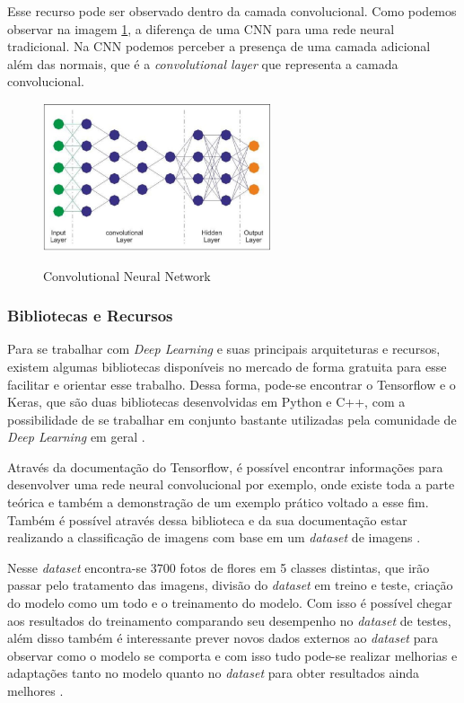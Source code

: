 Esse recurso pode ser observado dentro da camada convolucional. Como podemos observar na imagem \ref{fig:cnn}, a diferença de uma CNN para uma rede neural tradicional. Na CNN podemos perceber a presença de uma camada adicional além das normais, que é a \emph{convolutional layer} que representa a camada convolucional.

\begin{figure}[!htb]
	\centering
	\caption{Convolutional Neural Network}
	\includegraphics[width=0.60\textwidth]{img/cnn.jpg}
	\label{fig:cnn}
\end{figure}

\subsubsection{Bibliotecas e Recursos}
Para se trabalhar com \emph{Deep Learning} e suas principais arquiteturas e recursos, existem algumas bibliotecas disponíveis no mercado de forma gratuita para esse facilitar e orientar esse trabalho. Dessa forma, pode-se encontrar o Tensorflow e o Keras, que são duas bibliotecas desenvolvidas em Python e C++, com a possibilidade de se trabalhar em conjunto bastante utilizadas pela comunidade de \emph{Deep Learning} em geral \cite{deepLearningTensorFlow}.

Através da documentação do Tensorflow, é possível encontrar informações para desenvolver uma rede neural convolucional por exemplo, onde existe toda a parte teórica e também a demonstração de um exemplo prático voltado a esse fim. Também é possível através dessa biblioteca e da sua documentação estar realizando a classificação de imagens com base em um \emph{dataset} de imagens \cite{websiteTensorFlow}.

Nesse \emph{dataset} encontra-se 3700 fotos de flores em 5 classes distintas, que irão passar pelo tratamento das imagens, divisão do \emph{dataset} em treino e teste, criação do modelo como um todo e o treinamento do modelo. Com isso é possível chegar aos resultados do treinamento comparando seu desempenho no \emph{dataset} de testes, além disso também é interessante prever novos dados externos ao \emph{dataset} para observar como o modelo se comporta e com isso tudo pode-se realizar melhorias e adaptações tanto no modelo quanto no \emph{dataset} para obter resultados ainda melhores \cite{websiteTensorFlow}.

